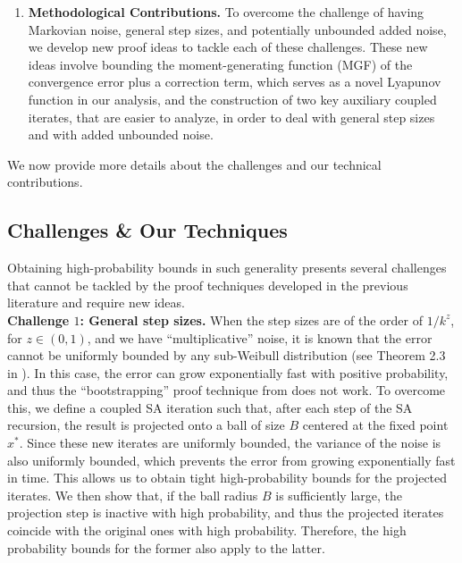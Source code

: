 \documentclass{article}
\begin{document}
\begin{enumerate}
\begin{table}[ht!]
{}
\label{tab:summary2}
\end{table}
    \item \textbf{Methodological Contributions.} To overcome the challenge of having Markovian noise, general step sizes, and potentially unbounded added noise, we develop new proof ideas to tackle each of these challenges. These new ideas involve bounding the moment-generating function (MGF) of the convergence error plus a correction term, %
    which serves as a novel Lyapunov function in our analysis, and the construction of two key auxiliary coupled iterates, that are easier to analyze, in order to deal with general step sizes and with added unbounded noise. 
\end{enumerate}

\noindent We now provide more details about the challenges and our technical contributions.



\subsection{Challenges \& Our Techniques}\label{subsec:challenge}


Obtaining high-probability bounds in such generality presents several challenges that cannot be tackled by the proof techniques developed in the previous literature and require new ideas.\\



\textbf{Challenge $1$: General step sizes.} When the step sizes are of the order of $1/k^z$, for $z\in(0,1)$, and we have ``multiplicative'' noise, it is known that the error cannot be uniformly bounded by any sub-Weibull distribution (see Theorem 2.3 in \citet{chen2025concentration}). In this case, the error can grow exponentially fast with positive probability, and thus the ``bootstrapping'' proof technique from \citet{chen2025concentration} does not work. To overcome this, we define a coupled SA iteration such that, after each step of the SA recursion, the result is projected onto a ball of size $B$ centered at the fixed point $x^*$. Since these new iterates are uniformly bounded, the variance of the noise is also uniformly bounded, which prevents the error from growing exponentially fast in time. This allows us to obtain tight high-probability bounds for the projected iterates. We then show that, if the ball radius $B$ is sufficiently large, the projection step is inactive with high probability, and thus the projected iterates coincide with the original ones with high probability. Therefore, the high probability bounds for the former also apply to the latter.\\
\end{document}
